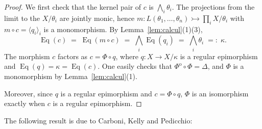 \documentclass[11pt,a4paper]{article}
\theoremstyle{plain}
\theoremstyle{definition}
\theoremstyle{remark}
\theoremstyle{plain}
\newcommand{\Eq}{\operatorname{Eq}}
\newcommand{\op}{\mathrm{o}}
\begin{document}
\begin{proof}
We first check that the kernel pair of $c$ is $\bigwedge_i \theta_i$. The
projections from the limit to the $X/\theta_i$ are jointly monic, hence
$m \colon L(\theta_1,\dots,\theta_n) \rightarrowtail
\prod_i X/\theta_i$ with $m \circ c = \langle q_i\rangle_i$ is a monomorphism. By
Lemma~\ref{lem:calcul}(1)(3),
\[
\Eq(c) \;=\; \Eq(m \circ c) \;=\; \bigwedge_i \Eq(q_i)
\;=\; \bigwedge_i \theta_i \;=:\; \kappa .
\]
The morphism $c$
factors as $c = \Phi \circ q$, where $q \colon X \rightarrow X/ \kappa$ is a regular epimorphism and
$\Eq(q) = \kappa = \Eq(c)$. One easily checks that $\Phi^{\op} \circ \Phi =\Delta$,
and $\Phi$ is a monomorphism by Lemma~\ref{lem:calcul}(1).

Moreover, since $q$ is a regular epimorphism and $c = \Phi \circ q$, $\Phi$ is an isomorphism exactly when $c$ is a regular
epimorphism.
\end{proof}

The following result is due to Carboni, Kelly and
Pedicchio:
\end{document}
